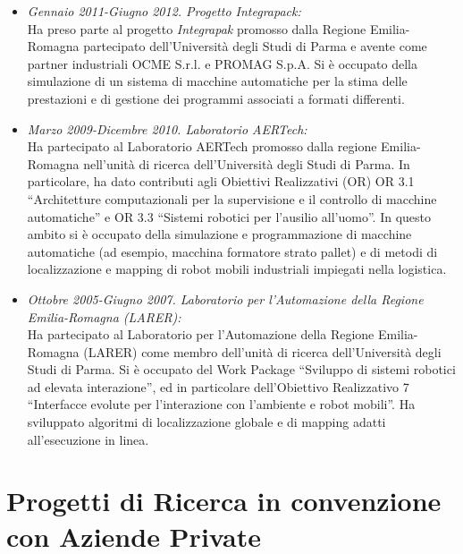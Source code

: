 \documentclass[11pt]{article}
\newcommand{\ITEMDATE}[1]{\item \textit{#1:}\\}
\begin{document}
\begin{itemize}
\ITEMDATE{Gennaio 2011-Giugno 2012. Progetto Integrapack} 
Ha preso parte al progetto \emph{Integrapak} promosso dalla Regione Emilia-Romagna partecipato 
dell'Universit\`a degli Studi di Parma
e avente come partner industriali OCME S.r.l. e PROMAG S.p.A.
Si \`e occupato della simulazione di un sistema di macchine automatiche per la stima delle prestazioni
e di gestione dei programmi associati a formati differenti. 

\ITEMDATE{Marzo 2009-Dicembre 2010. Laboratorio AERTech}
Ha partecipato al Laboratorio AERTech promosso dalla regione Emilia-Romagna nell'unit\`a di ricerca
dell'Universit\`a degli Studi di Parma.
In particolare, ha dato contributi agli Obiettivi Realizzativi (OR)
OR 3.1 ``Architetture computazionali per la supervisione e il controllo di macchine automatiche'' e
OR 3.3 ``Sistemi robotici per l'ausilio all'uomo''.
In questo ambito si \`e occupato della simulazione e programmazione di macchine automatiche 
(ad esempio, macchina formatore strato pallet) e di metodi di localizzazione e mapping 
di robot mobili industriali impiegati nella logistica. 

\ITEMDATE{Ottobre 2005-Giugno 2007. Laboratorio per l'Automazione della Regione Emilia-Romagna (LARER)}
Ha partecipato al Laboratorio per l'Automazione della Regione Emilia-Romagna (LARER) 
come membro dell'unit\`a di ricerca dell'Universit\`a degli Studi di Parma.
Si \`e occupato del Work Package ``Sviluppo di sistemi robotici ad elevata interazione'',
ed in particolare dell'Obiettivo Realizzativo 7 ``Interfacce evolute per l'interazione con l'ambiente e robot mobili''.
Ha sviluppato algoritmi di localizzazione globale e di mapping adatti all'esecuzione in linea.

\end{itemize}

\section*{Progetti di Ricerca in convenzione con Aziende Private}
\end{document}

